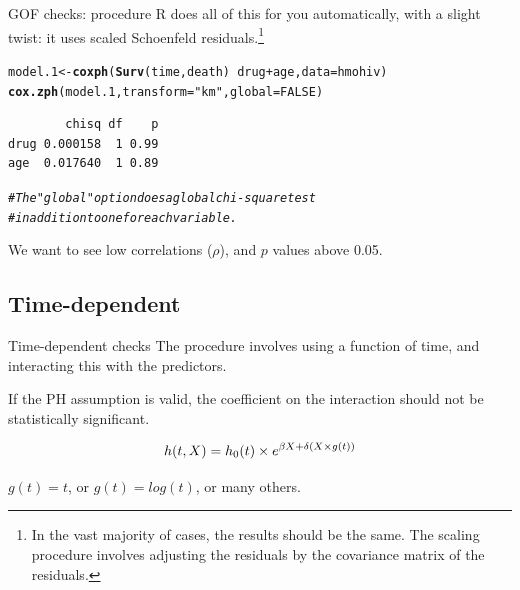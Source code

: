 \documentclass[12pt,english,pdf,xcolor=dvipsnames,aspectratio=169,handout]{beamer}\usepackage[]{graphicx}\usepackage[]{xcolor}
\makeatletter
\newcommand{\hlnum}[1]{\textcolor[rgb]{0.686,0.059,0.569}{#1}}%
\newcommand{\hlstr}[1]{\textcolor[rgb]{0.192,0.494,0.8}{#1}}%
\newcommand{\hlcom}[1]{\textcolor[rgb]{0.678,0.584,0.686}{\textit{#1}}}%
\newcommand{\hlopt}[1]{\textcolor[rgb]{0,0,0}{#1}}%
\newcommand{\hlstd}[1]{\textcolor[rgb]{0.345,0.345,0.345}{#1}}%
\newcommand{\hlkwb}[1]{\textcolor[rgb]{0.69,0.353,0.396}{#1}}%
\newcommand{\hlkwc}[1]{\textcolor[rgb]{0.333,0.667,0.333}{#1}}%
\newcommand{\hlkwd}[1]{\textcolor[rgb]{0.737,0.353,0.396}{\textbf{#1}}}%
\newenvironment{kframe}{%
 \def\at@end@of@kframe{}%
 \ifinner\ifhmode%
  \def\at@end@of@kframe{\end{minipage}}%
  \begin{minipage}{\columnwidth}%
 \fi\fi%
 \def\FrameCommand##1{\hskip\@totalleftmargin \hskip-\fboxsep
 \colorbox{shadecolor}{##1}\hskip-\fboxsep
     \hskip-\linewidth \hskip-\@totalleftmargin \hskip\columnwidth}%
 \MakeFramed {\advance\hsize-\width
   \@totalleftmargin\z@ \linewidth\hsize
   \@setminipage}}%
 {\par\unskip\endMakeFramed%
 \at@end@of@kframe}
\newenvironment{knitrout}{}{} %
\makeatother
\begin{document}
\begin{frame}[fragile]{GOF checks: procedure}
R does all of this for you automatically, with a slight twist: it uses scaled Schoenfeld residuals.\footnote{In the vast majority of cases, the results should be the same. The scaling procedure involves adjusting the residuals by the covariance matrix of the residuals.} \bigskip

\begin{knitrout}\scriptsize
{}\color{fgcolor}\begin{kframe}
\begin{alltt}
\hlstd{model.1} \hlkwb{<-} \hlkwd{coxph}\hlstd{(}\hlkwd{Surv}\hlstd{(time, death)} \hlopt{~} \hlstd{drug} \hlopt{+} \hlstd{age,} \hlkwc{data} \hlstd{= hmohiv)}
\hlkwd{cox.zph}\hlstd{(model.1,} \hlkwc{transform} \hlstd{=} \hlstr{"km"}\hlstd{,} \hlkwc{global} \hlstd{=} \hlnum{FALSE}\hlstd{)}
\end{alltt}
\begin{verbatim}
        chisq df    p
drug 0.000158  1 0.99
age  0.017640  1 0.89
\end{verbatim}
\begin{alltt}
\hlcom{# The "global" option does a global chi-square test}
\hlcom{# in addition to one for each variable.}
\end{alltt}
\end{kframe}
\end{knitrout}

We want to see low correlations ($\rho$), and $p$ values above 0.05.
\end{frame}


\subsection{Time-dependent}
\begin{frame}{Time-dependent checks}
The procedure involves using a function of time, and interacting this with the predictors.\bigskip

If the PH assumption is valid, the coefficient on the interaction should not be statistically significant.\bigskip

\begin{equation}
  \centering
  h(t,X)=h_0(t) \times e^{\beta X + \delta (X \times g(t))}
\end{equation}

$g(t)=t$, or $g(t)=log(t)$, or many others.
\end{frame}
\end{document}
